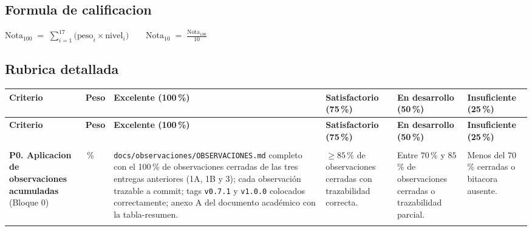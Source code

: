 \documentclass[11pt,a4paper]{article}
\begin{document}
\subsection{Formula de calificacion}

\begin{center}
$\displaystyle \text{Nota}_{100} \;=\; \sum_{i=1}^{17} \bigl(\text{peso}_{i} \times \text{nivel}_{i}\bigr) \qquad \text{Nota}_{10} \;=\; \frac{\text{Nota}_{100}}{10}$
\end{center}

\subsection{Rubrica detallada}

{
\footnotesize
\renewcommand{\arraystretch}{1.3}
\begin{longtable}{|L{2.9cm}|C{0.9cm}|L{2.5cm}|L{2.5cm}|L{2.5cm}|L{2.3cm}|}
\hline
{}
{\color{white}\textbf{Criterio}} &
{\color{white}\textbf{Peso}} &
{\color{white}\textbf{Excelente (100\,\%)}} &
{\color{white}\textbf{Satisfactorio (75\,\%)}} &
{\color{white}\textbf{En desarrollo (50\,\%)}} &
{\color{white}\textbf{Insuficiente (25\,\%)}} \\
\hline
\endfirsthead

\hline
{}
{\color{white}\textbf{Criterio}} &
{\color{white}\textbf{Peso}} &
{\color{white}\textbf{Excelente (100\,\%)}} &
{\color{white}\textbf{Satisfactorio (75\,\%)}} &
{\color{white}\textbf{En desarrollo (50\,\%)}} &
{\color{white}\textbf{Insuficiente (25\,\%)}} \\
\hline
\endhead

\\ \hline

\textbf{P0. Aplicacion de observaciones acumuladas} (Bloque 0) &
\,\% &
\texttt{docs/observaciones/OBSERVACIONES.md} completo con el 100\,\% de observaciones cerradas de las tres entregas anteriores (1A, 1B y 3); cada observaci\'{o}n trazable a commit; tags \texttt{v0.7.1} y \texttt{v1.0.0} colocados correctamente; anexo A del documento acad\'{e}mico con la tabla-resumen. &
$\geq 85$\,\% de observaciones cerradas con trazabilidad correcta. &
Entre $70$\,\% y $85$\,\% de observaciones cerradas o trazabilidad parcial. &
Menos del $70$\,\% cerradas o bitacora ausente. \\


\end{longtable}}
\end{document}

